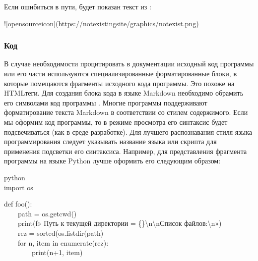 \documentclass[letterpaper,10pt,russian]{sphinxmanual}
\begin{document}
\sphinxAtStartPar
Если ошибиться в пути, будет показан текст из \sphinxcode{\sphinxupquote{{[}{]}}}:

\begin{sphinxVerbatim}[commandchars=\\\{\}]
![opensource\PYGZus{}icon](https://not\PYGZus{}existing\PYGZus{}site/graphics/not\PYGZus{}exist.png)
\end{sphinxVerbatim}

\sphinxAtStartPar


\sphinxAtStartPar
{}


\subsubsection{Код}
\label{\detokenize{educational_materials/docs/content:id9}}
\sphinxAtStartPar
В случае необходимости процитировать в документации исходный код программы или его части используются специализированные форматированные блоки, в которые помещаются фрагменты исходного кода программы. Это похоже на HTML\sphinxhyphen{}теги. Для создания блока кода в языке Markdown необходимо обрамить его символами \textasciigrave{}\textasciigrave{}\textasciigrave{} код программы \textasciigrave{}\textasciigrave{}\textasciigrave{}. Многие программы поддерживают форматирование текста Markdown в соответствии со стилем содержимого. Если мы оформим код программы, то в режиме просмотра его синтаксис будет подсвечиваться (как в среде разработке). Для лучшего распознавания стиля языка программирования следует указывать название языка или скрипта для применения подсветки его синтаксиса. Например, для представления фрагмента программы на языке Python лучше оформить его следующим образом:

\sphinxAtStartPar
\textasciigrave{}\textasciigrave{}\textasciigrave{}python\\
import os

\sphinxAtStartPar
def foo():\\
    path = os.getcwd()\\
    print(f» Путь к текущей директории = \{\}\textbackslash{}n\textbackslash{}nСписок файлов:\textbackslash{}n»)\\
    rez = sorted(os.listdir(path)\\
    for n, item in enumerate(rez):\\
        print(n+1, item)\\
\textasciigrave{}\textasciigrave{}\textasciigrave{}
\end{document}
